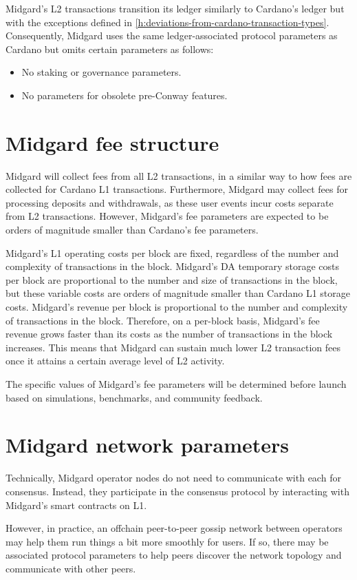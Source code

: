 \documentclass[../midgard.tex]{subfiles}
\begin{document}
Midgard's L2 transactions transition its ledger similarly to Cardano's ledger but with the exceptions defined in \cref{h:deviations-from-cardano-transaction-types}.
Consequently, Midgard uses the same ledger-associated protocol parameters as Cardano but omits certain parameters as follows:
\begin{itemize}
  \item No staking or governance parameters.
  \item No parameters for obsolete pre-Conway features.
\end{itemize}

\section{Midgard fee structure}
\label{h:midgard-fee-structure}

Midgard will collect fees from all L2 transactions, in a similar way to how fees are collected for Cardano L1 transactions.
Furthermore, Midgard may collect fees for processing deposits and withdrawals, as these user events incur costs separate from L2 transactions.
However, Midgard's fee parameters are expected to be orders of magnitude smaller than Cardano's fee parameters.

Midgard's L1 operating costs per block are fixed, regardless of the number and complexity of transactions in the block.
Midgard's DA temporary storage costs per block are proportional to the number and size of transactions in the block, but these variable costs are orders of magnitude smaller than Cardano L1 storage costs.
Midgard's revenue per block is proportional to the number and complexity of transactions in the block.
Therefore, on a per-block basis, Midgard's fee revenue grows faster than its costs as the number of transactions in the block increases.
This means that Midgard can sustain much lower L2 transaction fees once it attains a certain average level of L2 activity.

The specific values of Midgard's fee parameters will be determined before launch based on simulations, benchmarks, and community feedback.

\section{Midgard network parameters}
\label{h:midgard-network-parameters}

Technically, Midgard operator nodes do not need to communicate with each for consensus.
Instead, they participate in the consensus protocol by interacting with Midgard's smart contracts on L1.

However, in practice, an offchain peer-to-peer gossip network between operators may help them run things a bit more smoothly for users.
If so, there may be associated protocol parameters to help peers discover the network topology and communicate with other peers.
\end{document}
